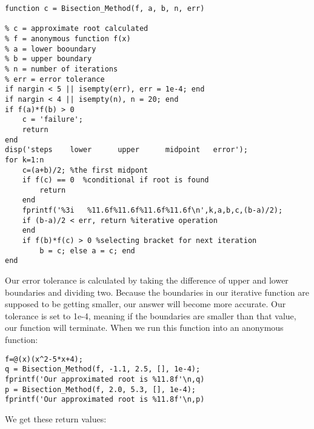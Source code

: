 \documentclass[12pt]{article}
\begin{document}
\begin{lstlisting}[style=Matlab-editor]
function c = Bisection_Method(f, a, b, n, err)

% c = approximate root calculated 
% f = anonymous function f(x) 
% a = lower booundary 
% b = upper boundary 
% n = number of iterations 
% err = error tolerance 
if nargin < 5 || isempty(err), err = 1e-4; end
if nargin < 4 || isempty(n), n = 20; end
if f(a)*f(b) > 0
    c = 'failure';
    return
end
disp('steps    lower      upper      midpoint   error');
for k=1:n
    c=(a+b)/2; %the first midpont
    if f(c) == 0  %conditional if root is found
        return
    end
    fprintf('%3i   %11.6f%11.6f%11.6f%11.6f\n',k,a,b,c,(b-a)/2);
    if (b-a)/2 < err, return %iterative operation
    end
    if f(b)*f(c) > 0 %selecting bracket for next iteration
        b = c; else a = c; end
end
\end{lstlisting}
Our error tolerance is calculated by taking the difference of upper and lower boundaries and dividing two. Because the boundaries in our iterative function are supposed to be getting smaller, our answer will become more accurate. Our tolerance is set to 1e-4, meaning if the boundaries are smaller than that value, our function will terminate.
\newline
When we run this function into an anonymous function:

\begin{lstlisting}[style=Matlab-editor]
f=@(x)(x^2-5*x+4);
q = Bisection_Method(f, -1.1, 2.5, [], 1e-4);
fprintf('Our approximated root is %11.8f'\n,q)
p = Bisection_Method(f, 2.0, 5.3, [], 1e-4);
fprintf('Our approximated root is %11.8f'\n,p)
\end{lstlisting}


We get these return values:
\end{document}
